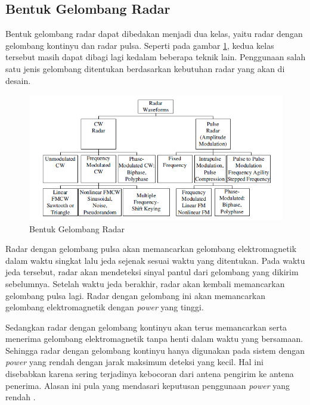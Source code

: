 \subsection{Bentuk Gelombang Radar}

Bentuk gelombang radar dapat dibedakan menjadi dua kelas, yaitu radar dengan gelombang kontinyu dan radar pulsa. Seperti pada gambar \ref{pic:bentukgelradar}, kedua kelas tersebut masih dapat dibagi lagi kedalam beberapa teknik lain. Penggunaan salah satu jenis gelombang ditentukan berdasarkan kebutuhan radar yang akan di desain. 

\begin{figure}
	\begin{center}
		\includegraphics[scale=0.8]{pics/bab2/radarwaveform.png}
		\caption[Bentuk Gelombang Radar]{Bentuk Gelombang Radar \cite{Melvin2014}}
		\label{pic:bentukgelradar}
	\end{center}
\end{figure}


Radar dengan gelombang pulsa akan memancarkan gelombang elektromagnetik dalam waktu singkat lalu jeda sejenak sesuai waktu yang ditentukan. Pada waktu jeda tersebut, radar akan mendeteksi sinyal pantul dari gelombang yang dikirim sebelumnya. Setelah waktu jeda berakhir, radar akan kembali memancarkan gelombang pulsa lagi. Radar dengan gelombang ini akan memancarkan gelombang elektromagnetik dengan \textit{power} yang tinggi. 

Sedangkan radar dengan gelombang kontinyu akan terus memancarkan serta menerima gelombang elektromagnetik tanpa henti dalam waktu yang bersamaan. Sehingga radar dengan gelombang kontinyu hanya digunakan pada sistem dengan \textit{power} yang rendah dengan jarak maksimum deteksi yang kecil. Hal ini disebabkan karena sering terjadinya kebocoran dari antena pengirim ke antena penerima. Alasan ini pula yang mendasari keputusan penggunaan \textit{power} yang rendah \cite{Scheer2015}.

